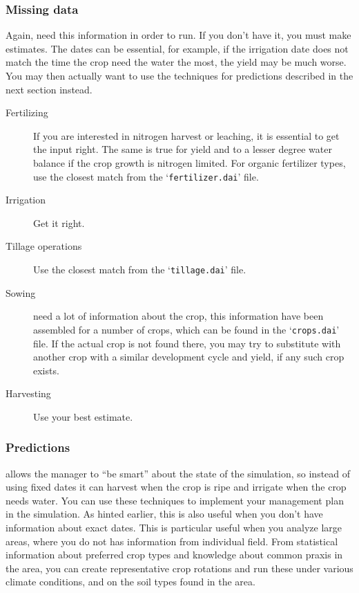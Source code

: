 \documentclass[a4paper,11pt,twoside]{article}
\begin{document}
\subsubsection{Missing data}

Again, \daisy{} need this information in order to run.  If you don't
have it, you must make estimates.  The dates can be essential, for
example, if the irrigation date does not match the time the crop need
the water the most, the yield may be much worse.  You may then
actually want to use the techniques for predictions described in the
next section instead.
\begin{description}
\item[Fertilizing] If you are interested in nitrogen harvest or
  leaching, it is essential to get the input right.  The same is true
  for yield and to a lesser degree water balance if the crop growth
  is nitrogen limited.  For organic fertilizer types, use the closest
  match from the `\texttt{fertilizer.dai}' file.
\item[Irrigation] Get it right.
\item[Tillage operations]  Use the closest match from the
  `\texttt{tillage.dai}' file.
\item[Sowing] \Daisy{} need a lot of information about the crop, this
  information have been assembled for a number of crops, which can be
  found in the `\texttt{crops.dai}' file.  If the actual crop is not
  found there, you may try to substitute with another crop with a
  similar development cycle and yield, if any such crop exists.
\item[Harvesting] Use your best estimate.
\end{description}

\subsubsection{Predictions}
\label{sec:predict}

\Daisy{} allows the manager to ``be smart'' about the state of the
simulation, so instead of using fixed dates it can harvest when the
crop is ripe and irrigate when the crop needs water.  You can use these
techniques to implement your management plan in the simulation.  As
hinted earlier, this is also useful when you don't have information
about exact dates.  This is particular useful when you analyze large
areas, where you do not has information from individual field.  From
statistical information about preferred crop types and knowledge about
common praxis in the area, you can create representative crop
rotations and run these under various climate conditions, and on the
soil types found in the area.
\end{document}
